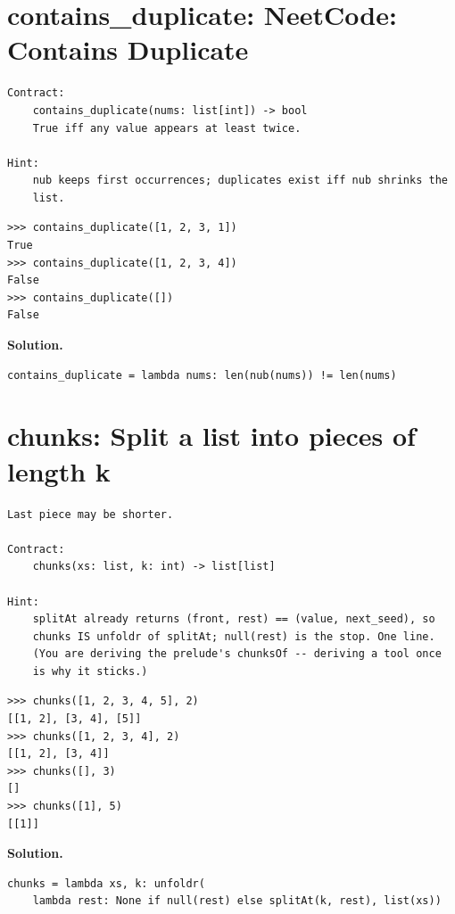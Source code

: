 \documentclass[10pt,letterpaper]{book}
\begin{document}
\section{contains\_duplicate: NeetCode: Contains Duplicate}
\begin{lstlisting}[style=ex]
Contract:
    contains_duplicate(nums: list[int]) -> bool
    True iff any value appears at least twice.

Hint:
    nub keeps first occurrences; duplicates exist iff nub shrinks the
    list.
\end{lstlisting}
\begin{lstlisting}[style=ex]
>>> contains_duplicate([1, 2, 3, 1])
True
>>> contains_duplicate([1, 2, 3, 4])
False
>>> contains_duplicate([])
False
\end{lstlisting}
\noindent\textbf{Solution.}
\begin{lstlisting}[style=code]
contains_duplicate = lambda nums: len(nub(nums)) != len(nums)
\end{lstlisting}

\section{chunks: Split a list into pieces of length k}
\begin{lstlisting}[style=ex]
Last piece may be shorter.

Contract:
    chunks(xs: list, k: int) -> list[list]

Hint:
    splitAt already returns (front, rest) == (value, next_seed), so
    chunks IS unfoldr of splitAt; null(rest) is the stop. One line.
    (You are deriving the prelude's chunksOf -- deriving a tool once
    is why it sticks.)
\end{lstlisting}
\begin{lstlisting}[style=ex]
>>> chunks([1, 2, 3, 4, 5], 2)
[[1, 2], [3, 4], [5]]
>>> chunks([1, 2, 3, 4], 2)
[[1, 2], [3, 4]]
>>> chunks([], 3)
[]
>>> chunks([1], 5)
[[1]]
\end{lstlisting}
\noindent\textbf{Solution.}
\begin{lstlisting}[style=code]
chunks = lambda xs, k: unfoldr(
    lambda rest: None if null(rest) else splitAt(k, rest), list(xs))
\end{lstlisting}
\end{document}
